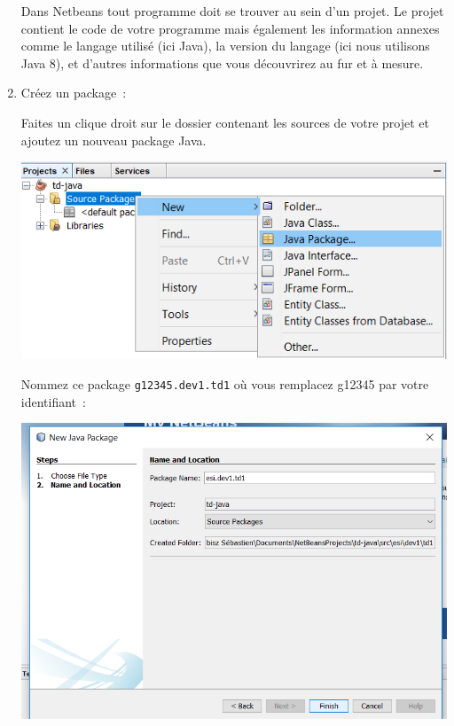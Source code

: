 \documentclass[a4paper,11pt]{article}
\begin{document}
\begin{enumerate}
		Dans Netbeans tout programme doit se trouver au sein d'un projet.
		Le projet contient le code de votre programme mais également les 
		information annexes comme le langage utilisé (ici Java), 
		la version du langage (ici nous utilisons Java 8), 
		et d'autres informations que vous découvrirez au fur et à mesure.



		\item Créez un package~: 
		
			Faites un clique droit sur le dossier contenant les sources de votre projet et 
			ajoutez un nouveau package Java.
		
			\bigskip
			\begin{center}
				\includegraphics[width=\textwidth]{images/nb_newproject_package}
			\end{center}

			Nommez ce package \texttt{g12345.dev1.td1} où vous remplacez g12345 par votre identifiant~:
			\bigskip
			\begin{center}
				\includegraphics[width=\textwidth]{images/nb_newproject_package2}
			\end{center}
			

\end{enumerate}
\end{document}
